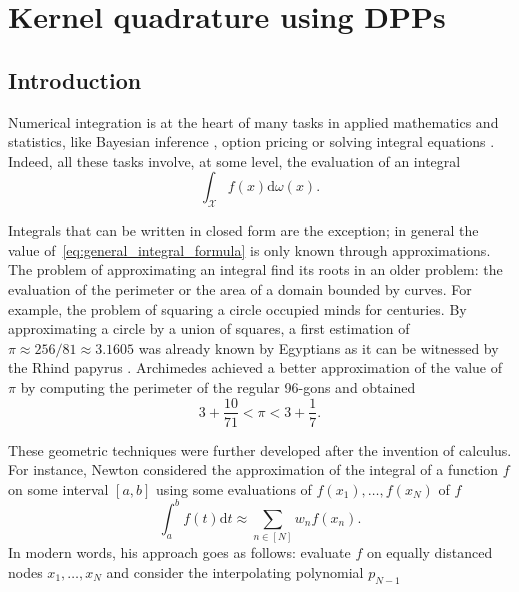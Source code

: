 \documentclass[twoside,11pt]{book}
\numberwithin{theorem}{chapter}
\numberwithin{definition}{chapter}
\numberwithin{proposition}{chapter}
\numberwithin{corollary}{chapter}
\numberwithin{example}{chapter}
\numberwithin{lemma}{chapter}
\numberwithin{assumption}{chapter}
\numberwithin{equation}{chapter}
\numberwithin{figure}{chapter}
\begin{document}
\chapter{Kernel quadrature using DPPs}\label{chap:dppkq}
\section{Introduction}
Numerical integration is at the heart of many tasks in applied mathematics and statistics, like Bayesian inference \citep{RoCa04}, option pricing \citep{Gla13} or solving integral equations \citep{KrMaKo89}. Indeed, all these tasks involve, at some level, the evaluation of an integral
\begin{equation}\label{eq:general_integral_formula}
\int_{\mathcal{X}}f(x)\mathrm{d}\omega(x).
\end{equation}

Integrals that can be written in closed form are the exception; in general the value of~\eqref{eq:general_integral_formula} is only known through approximations. The problem of approximating an integral find its roots in an older problem:
the evaluation of the perimeter or the area of a domain bounded by curves. For example, the problem of squaring a circle occupied minds for centuries. By approximating a circle by a union of squares, a first estimation of $\pi \approx 256/81 \approx 3.1605$ was already known by Egyptians as it can be witnessed by the Rhind papyrus \citep{RoSh87}. Archimedes achieved a better approximation of the value of $\pi$ by computing the perimeter of the regular 96-gons and obtained \citep{Hea03}
$$3+\frac{10}{71} < \pi < 3+\frac{1}{7}.$$


 These geometric techniques were further developed after the invention of calculus. For instance, Newton considered the approximation of the integral of a function $f$ on some interval $[a,b]$ using some evaluations of $f(x_{1}), \dots, f(x_{N})$ of $f$
\begin{equation}
\int_{a}^{b}f(t)\mathrm{d}t \approx \sum\limits_{n \in [N]}w_{n}f(x_{n}).
\end{equation}
 In modern words, his approach goes as follows: evaluate $f$ on equally distanced nodes $x_{1}, \dots, x_{N}$ and consider the interpolating polynomial $p_{N-1}$

\end{document}
